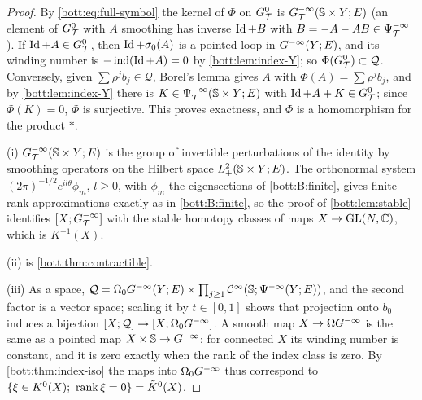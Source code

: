 \begin{proof}
  By \eqref{bott:eq:full-symbol} the kernel of $\Phi$ on $G^{0}_{\mathcal{T}}$ is $G^{-\infty}_{\mathcal{T}}(\mathbb{S}\times Y;E)$
  (an element of $G^{0}_{\mathcal{T}}$ with $A$ smoothing has inverse $\operatorname{Id}+B$ with
  $B=-A-AB\in\Psi^{-\infty}_{\mathcal{T}}$). If $\operatorname{Id}+A\in G^{0}_{\mathcal{T}}$, then $\operatorname{Id}+\sigma_0(A)$ is a pointed loop in
  $G^{-\infty}(Y;E)$, and its winding number is $-\operatorname{ind}(\operatorname{Id}+A)=0$ by \cref{bott:lem:index-Y}; so
  $\Phi(G^{0}_{\mathcal{T}})\subset\mathcal Q$. Conversely, given $\sum\rho^jb_j\in\mathcal Q$, Borel's lemma
  gives $A$ with $\Phi(A)=\sum\rho^jb_j$, and by \cref{bott:lem:index-Y} there is
  $K\in\Psi^{-\infty}_{\mathcal{T}}(\mathbb{S}\times Y;E)$ with $\operatorname{Id}+A+K\in G^{0}_{\mathcal{T}}$; since $\Phi(K)=0$, $\Phi$ is
  surjective. This proves exactness, and $\Phi$ is a homomorphism for the product $*$.

  (i) $G^{-\infty}_{\mathcal{T}}(\mathbb{S}\times Y;E)$ is the group of invertible perturbations of the identity
  by smoothing operators on the Hilbert space $L^2_+(\mathbb{S}\times Y;E)$. The orthonormal
  system $(2\pi)^{-1/2}e^{il\theta}\phi_m$, $l\ge0$, with $\phi_m$ the eigensections of
  \ref{bott:B:finite}, gives finite rank approximations exactly as in \ref{bott:B:finite}, so
  the proof of \cref{bott:lem:stable} identifies $[X;G^{-\infty}_{\mathcal{T}}]$ with the stable homotopy
  classes of maps $X\to\operatorname{GL}(N,\mathbb{C})$, which is $K^{-1}(X)$.

  (ii) is \cref{bott:thm:contractible}.

  (iii) As a space, $\mathcal Q=\Omega_0G^{-\infty}(Y;E)\times\prod_{j\ge1}\mathcal{C}^\infty(\mathbb{S};\Psi^{-\infty}(Y;E))$,
  and the second factor is a vector space; scaling it by $t\in[0,1]$ shows that projection
  onto $b_0$ induces a bijection $[X;\mathcal Q]\to[X;\Omega_0G^{-\infty}]$. A smooth map
  $X\to\Omega G^{-\infty}$ is the same as a pointed map $X\times\mathbb{S}\to G^{-\infty}$; for connected $X$
  its winding number is constant, and it is zero exactly when the rank of the index class
  is zero. By \cref{bott:thm:index-iso} the maps into $\Omega_0G^{-\infty}$ thus correspond to
  $\{\xi\in K^0(X);\ \operatorname{rank}\xi=0\}=\tilde K^0(X)$.


\end{proof}
